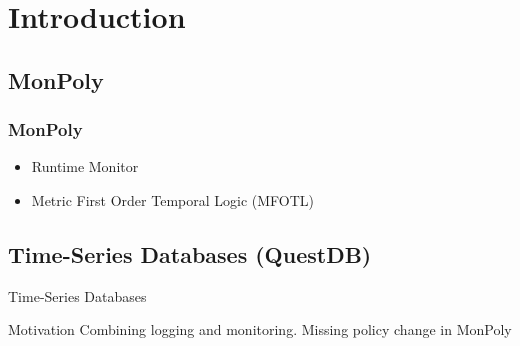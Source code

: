 \section{Introduction}
\subsection{MonPoly}

\begin{frame}
    \frametitle{MonPoly}
    \begin{itemize}
        \item Runtime Monitor
        \item Metric First Order Temporal Logic (MFOTL)
    \end{itemize}
\end{frame}


\subsection{Time-Series Databases (QuestDB)}

\begin{frame}{Time-Series Databases}
    
\end{frame}


\begin{frame}{Motivation}
    Combining logging and monitoring.
    Missing policy change in MonPoly
    
\end{frame}